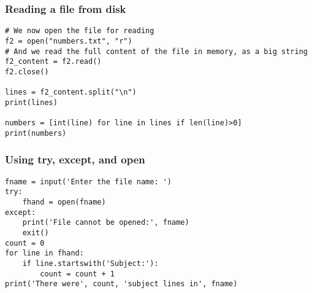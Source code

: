 \begin{frame}[fragile]\frametitle{Reading a file from disk}
\begin{lstlisting}
# We now open the file for reading
f2 = open("numbers.txt", "r")
# And we read the full content of the file in memory, as a big string
f2_content = f2.read()
f2.close()

lines = f2_content.split("\n")
print(lines)

numbers = [int(line) for line in lines if len(line)>0]
print(numbers)
\end{lstlisting}
\end{frame}

\begin{frame}[fragile]\frametitle{Using try, except, and open}
\begin{lstlisting}
fname = input('Enter the file name: ')
try:
	fhand = open(fname)
except:
	print('File cannot be opened:', fname)
	exit()
count = 0
for line in fhand:
	if line.startswith('Subject:'):
		count = count + 1
print('There were', count, 'subject lines in', fname)
\end{lstlisting}
\end{frame}


